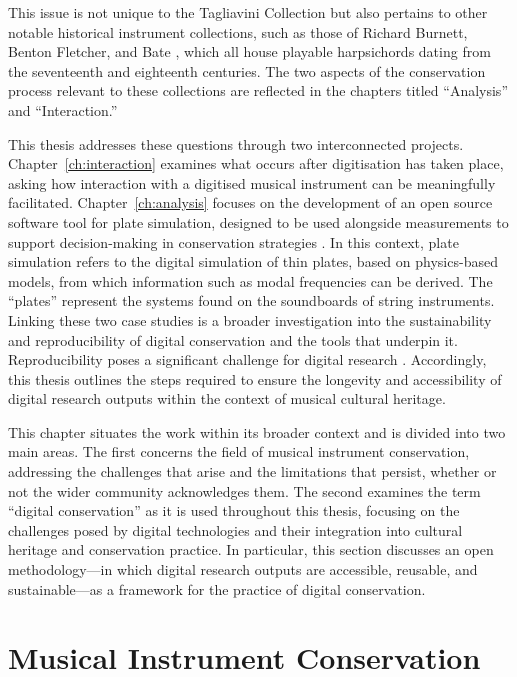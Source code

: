 This issue is not unique to the Tagliavini Collection but also pertains to other
notable historical instrument collections, such as those of Richard Burnett,
Benton Fletcher, and Bate \cite{barclay_preservation_2005}, which all house
playable harpsichords dating from the seventeenth and eighteenth centuries. The
two aspects of the conservation process relevant to these collections are
reflected in the chapters titled ``Analysis'' and ``Interaction.''

This thesis addresses these questions through two interconnected projects.
Chapter~\ref{ch:interaction} examines what occurs after digitisation has taken
place, asking how interaction with a digitised musical instrument can be
meaningfully facilitated. Chapter~\ref{ch:analysis} focuses on the development
of an open source software tool for plate simulation, designed to be used
alongside measurements to support decision-making in conservation strategies
\cite{barclay_care_1997}. In this context, plate simulation refers to the
digital simulation of thin plates, based on physics-based models, from which
information such as modal frequencies can be derived. The ``plates'' represent
the systems found on the soundboards of string instruments. Linking these two
case studies is a broader investigation into the sustainability and
reproducibility of digital conservation and the tools that underpin it.
Reproducibility poses a significant challenge for digital research
\cite{perkel_challenge_2020}. Accordingly, this thesis outlines the steps
required to ensure the longevity and accessibility of digital research outputs
\cite{soito_citations_2016,smith_software_2016,katz_recognizing_2021,stall_journal_2023}
within the context of musical cultural heritage.

This chapter situates the work within its broader context and is divided into
two main areas. The first concerns the field of musical instrument conservation,
addressing the challenges that arise and the limitations that persist, whether
or not the wider community acknowledges them. The second examines the term
``digital conservation'' as it is used throughout this thesis, focusing on the
challenges posed by digital technologies and their integration into cultural
heritage and conservation practice. In particular, this section discusses an
open methodology---in which digital research outputs are accessible, reusable, and
sustainable---as a framework for the practice of digital conservation.


\section{Musical Instrument Conservation}

